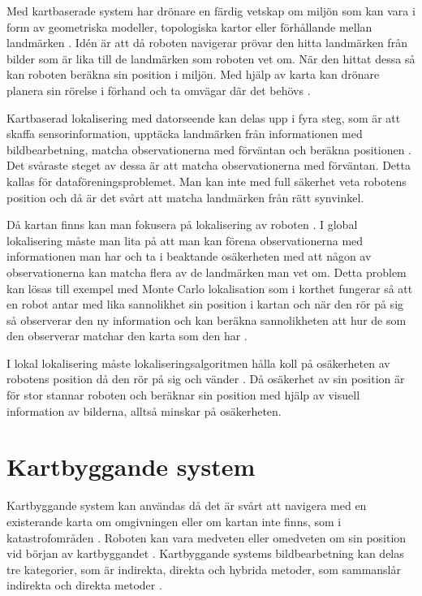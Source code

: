 Med kartbaserade system har drönare en färdig vetskap om miljön som kan vara i form av geometriska modeller, topologiska kartor eller förhållande mellan landmärken \citep{982903}. Idén är att då roboten navigerar prövar den hitta landmärken från bilder som är lika till de landmärken som roboten vet om. När den hittat dessa så kan roboten beräkna sin position i miljön. Med hjälp av karta kan drönare planera sin rörelse i förhand och ta omvägar där det behövs \citep{geospatial}. 

Kartbaserad lokalisering med datorseende kan delas upp i fyra steg, som är att skaffa sensorinformation, upptäcka landmärken från informationen med bildbearbetning, matcha observationerna med förväntan och beräkna positionen \citep{982903}. Det svåraste steget av dessa är att matcha observationerna med förväntan. Detta kallas för dataföreningsproblemet. Man kan inte med full säkerhet veta robotens position och då är det svårt att matcha landmärken från rätt synvinkel.

Då kartan finns kan man fokusera på lokalisering av roboten \citep{982903}. I global lokalisering måste man lita på att man kan förena observationerna med informationen man har och ta i beaktande osäkerheten med att någon av observationerna kan matcha flera av de landmärken man vet om. Detta problem kan lösas till exempel med Monte Carlo lokalisation som i korthet fungerar så att en robot antar med lika sannolikhet sin position i kartan och när den rör på sig så observerar den ny information och kan beräkna sannolikheten att hur de som den observerar matchar den karta som den har \citep{772544}.

I lokal lokalisering måste lokaliseringsalgoritmen hålla koll på osäkerheten av robotens position då den rör på sig och vänder \citep{772544}. Då osäkerhet av sin position är för stor stannar roboten och beräknar sin position med hjälp av visuell information av bilderna, alltså minskar på osäkerheten.

\section{Kartbyggande system}

Kartbyggande system kan användas då det är svårt att navigera med en existerande karta om omgivningen eller om kartan inte finns, som i katastrofområden \citep{geospatial}. Roboten kan vara medveten eller omedveten om sin position vid början av kartbyggandet \citep{globalsubmaps}. Kartbyggande systems bildbearbetning kan delas tre kategorier, som är indirekta, direkta och hybrida metoder, som sammanslår indirekta och direkta metoder \citep{geospatial}.

